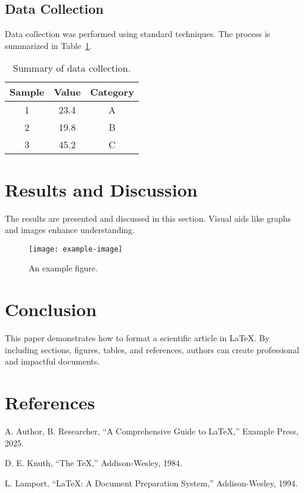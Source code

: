 \documentclass[twocolumn]{article}
\begin{document}
    \subsection{Data Collection}
    Data collection was performed using standard techniques. The process is summarized in Table~\ref{tab:data}.

    \begin{table}[h]
        \centering
        \begin{tabular}{|c|c|c|}
            \hline
            Sample & Value & Category \\
            \hline
            1      & 23.4  & A        \\
            2      & 19.8  & B        \\
            3      & 45.2  & C        \\
            \hline
        \end{tabular}
        \caption{Summary of data collection.}
        \label{tab:data}
    \end{table}

    \section{Results and Discussion}
    The results are presented and discussed in this section. Visual aids like graphs and images enhance understanding.

    \begin{figure}[h]
        \centering
        \texttt{[image: example-image]}
        \caption{An example figure.}
        \label{fig:example}
    \end{figure}

    \lipsum[5-6]

    \section{Conclusion}
    This paper demonstrates how to format a scientific article in \LaTeX. By including sections, figures, tables, and references, authors can create professional and impactful documents.

    \lipsum[7-8]

    \section*{References}
    \begin{thebibliography}{9}
         A. Author, B. Researcher, ``A Comprehensive Guide to \LaTeX,'' Example Press, 2025.

         D. E. Knuth, ``The \TeX\book,'' Addison-Wesley, 1984.

         L. Lamport, ``\LaTeX: A Document Preparation System,'' Addison-Wesley, 1994.
    \end{thebibliography}
\end{document}
